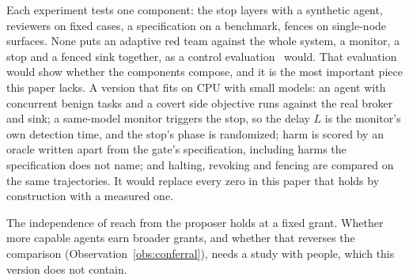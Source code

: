 Each experiment tests one component: the stop layers with a synthetic agent,
reviewers on fixed cases, a specification on a benchmark, fences on single-node surfaces. None puts an adaptive red
team against the whole system, a monitor, a stop and a fenced sink together, as a control evaluation~\cite{control}
would. That evaluation would show whether the components compose, and it is the most important piece this paper lacks.
A version that fits on CPU with small models: an agent with concurrent benign tasks and a covert side objective runs
against the real broker and sink; a same-model monitor triggers the stop, so the delay \(L\) is the monitor's own
detection time, and the stop's phase is randomized; harm is scored by an oracle written apart from the gate's
specification, including harms the specification does not name; and halting, revoking and fencing are compared on the
same trajectories. It would replace every zero in this paper that holds by construction with a measured one.

 The independence of reach from the proposer holds at a fixed grant. Whether more capable agents earn
broader grants, and whether that reverses the comparison (Observation~\ref{obs:conferral}), needs a study with people,
which this version does not contain.
